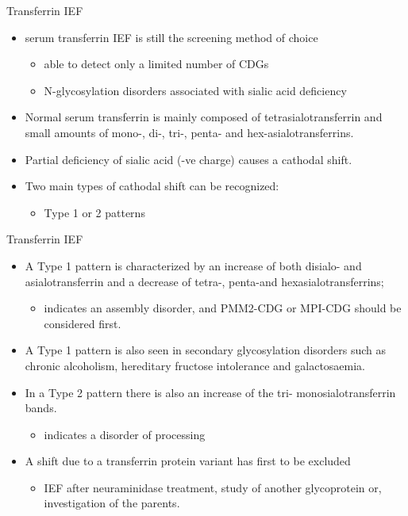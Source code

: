 \documentclass[presentation, smaller]{beamer}
\begin{document}
\begin{frame}[label={sec:orga6ccf26}]{Transferrin IEF}
\begin{itemize}
\item serum transferrin IEF is still the screening method of choice
\begin{itemize}
\item able to detect only a limited number of CDGs
\item N-glycosylation disorders associated with sialic acid deficiency
\end{itemize}

\item Normal serum transferrin is mainly composed of tetrasialotransferrin
and small amounts of mono-, di-, tri-, penta- and
hex-asialotransferrins.

\item Partial deficiency of sialic acid (-ve charge) causes a
cathodal shift.

\item Two main types of cathodal shift can be recognized:
\begin{itemize}
\item Type 1 or 2 patterns
\end{itemize}
\end{itemize}
\end{frame}

\begin{frame}[label={sec:org72bc610}]{Transferrin IEF}
\begin{itemize}
\item A Type 1 pattern is characterized by an increase of both disialo- and
asialotransferrin and a decrease of tetra-, penta-and
hexasialotransferrins;

\begin{itemize}
\item indicates an assembly disorder, and PMM2-CDG or MPI-CDG should be
considered first.
\end{itemize}

\item A Type 1 pattern is also seen in secondary glycosylation disorders
such as chronic alcoholism, hereditary fructose intolerance and
galactosaemia.

\item In a Type 2 pattern there is also an increase of the tri- \textpm{}
monosialotransferrin bands.
\begin{itemize}
\item indicates a disorder of processing
\end{itemize}

\item A shift due to a transferrin protein variant has first to be excluded
\begin{itemize}
\item IEF after neuraminidase treatment, study of another glycoprotein
or, investigation of the parents.
\end{itemize}
\end{itemize}
\end{frame}
\end{document}
